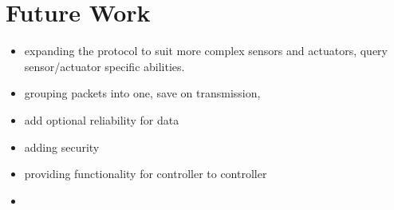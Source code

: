 
\section{Future Work}

\begin{itemize}
	\item expanding the protocol to suit more complex sensors and actuators, query sensor/actuator specific abilities.
	\item grouping packets into one, save on transmission,
	\item add optional reliability for data
	\item adding security
	\item providing functionality for controller to controller
	\item 
\end{itemize}